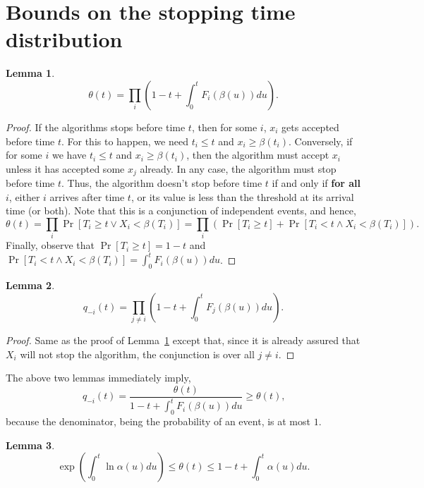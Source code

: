 \documentclass[10pt, letterpaper, twoside]{article}
\newtheorem{lemma}{Lemma}
\begin{document}
\section{Bounds on the stopping time distribution}

\begin{lemma}\label{lem_theta}
\[\theta(t)=\prod_i\left(1-t+\int_0^tF_i(\beta(u))du\right)\text{.}\]
\end{lemma}

\begin{proof}
If the algorithms stops before time $t$, then for some $i$, $x_i$ gets accepted before time $t$. For this to happen, we need $t_i\leq t$ and $x_i\geq\beta(t_i)$. Conversely, if for some $i$ we have $t_i\leq t$ and $x_i\geq\beta(t_i)$, then the algorithm must accept $x_i$ unless it has accepted some $x_j$ already. In any case, the algorithm must stop before time $t$. Thus, the algorithm doesn't stop before time $t$ if and only if \textbf{for all $i$}, either $i$ arrives after time $t$, or its value is less than the threshold at its arrival time (or both). Note that this is a conjunction of independent events, and hence,
\[\theta(t)=\prod_i\Pr[T_i\geq t\vee X_i<\beta(T_i)]=\prod_i\left(\Pr[T_i\geq t]+\Pr[T_i<t\wedge X_i<\beta(T_i)]\right)\text{.}\]
Finally, observe that $\Pr[T_i\geq t]=1-t$ and $\Pr[T_i<t\wedge X_i<\beta(T_i)]=\int_0^tF_i(\beta(u))du$.
\end{proof}

\begin{lemma}
\[q_{-i}(t)=\prod_{j\neq i}\left(1-t+\int_0^tF_j(\beta(u))du\right)\text{.}\]
\end{lemma}

\begin{proof}
Same as the proof of Lemma~\ref{lem_theta} except that, since it is already assured that $X_i$ will not stop the algorithm, the conjunction is over all $j\neq i$.
\end{proof}

The above two lemmas immediately imply,
\begin{equation}\label{eqn_q_theta}
q_{-i}(t)=\frac{\theta(t)}{1-t+\int_0^tF_i(\beta(u))du}\geq\theta(t)\text{,}
\end{equation}
because the denominator, being the probability of an event, is at most $1$.

\begin{lemma}\label{lem_theta_bounds}
\[\exp\left(\int_0^t\ln\alpha(u)du\right)\leq\theta(t)\leq1-t+\int_0^t\alpha(u)du\text{.}\]
\end{lemma}
\end{document}
